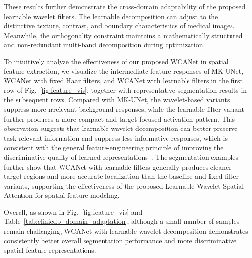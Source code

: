 \documentclass[a4paper,fleqn]{cas-dc}
\begin{document}
{ \color{green}
  These results further demonstrate the cross-domain adaptability of the proposed learnable wavelet filters. The learnable decomposition can adjust to the distinctive texture, contrast, and boundary characteristics of medical images. Meanwhile, the orthogonality constraint maintains a mathematically structured and non-redundant multi-band decomposition during optimization.
}

{\color{green}
To intuitively analyze the effectiveness of our proposed WCANet in spatial feature extraction, we visualize the intermediate feature responses of MK-UNet, WCANet with fixed Haar filters, and WCANet with learnable filters in the first row of Fig.~\ref{fig:feature_vis}, together with representative segmentation results in the subsequent rows. Compared with MK-UNet, the wavelet-based variants suppress more irrelevant background responses, while the learnable-filter variant further produces a more compact and target-focused activation pattern. 
This observation suggests that learnable wavelet decomposition can better preserve task-relevant information and suppress less informative responses, which is consistent with the general feature-engineering principle of improving the discriminative quality of learned representations~\cite{ravishankar2025survey}.
The segmentation examples further show that WCANet with learnable filters generally produces cleaner target regions and more accurate localization than the baseline and fixed-filter variants, supporting the effectiveness of the proposed Learnable Wavelet Spatial Attention for spatial feature modeling. 
}

{\color{green}
Overall, as shown in Fig.~\ref{fig:feature_vis} and Table~\ref{tab:clinicdb_domain_adaptation}, although a small number of samples remain challenging, WCANet with learnable wavelet decomposition demonstrates consistently better overall segmentation performance and more discriminative spatial feature representations.

}


\end{document}
